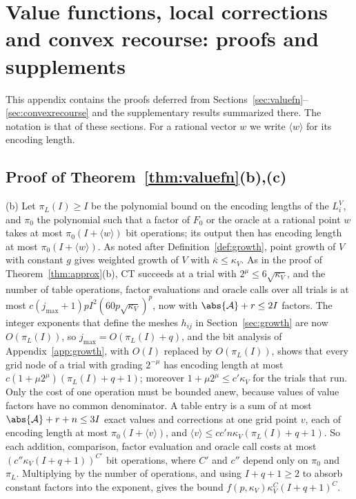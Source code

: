 \section{Value functions, local corrections and convex recourse: proofs and
supplements}\label{app:recourse-convex}

This appendix contains the proofs deferred from
Sections~\ref{sec:valuefn}--\ref{sec:convexrecourse} and the supplementary
results summarized there. The notation is that of these sections. For a
rational vector $w$ we write $\langle w\rangle$ for its encoding length.

\subsection{Proof of Theorem~\ref{thm:valuefn}(b),(c)}

(b) Let $\pi_L(I)\ge I$ be the polynomial bound on the encoding lengths of
the $L_i^V$, and $\pi_0$ the polynomial such that a factor of $F_0$ or the
oracle at a rational point $w$ takes at most $\pi_0(I+\langle w\rangle)$ bit
operations; its output then has encoding length at most
$\pi_0(I+\langle w\rangle)$. As noted after Definition~\ref{def:growth},
point growth of $V$ with constant
$g$ gives weighted growth of $V$ with $\bar\kappa\le\kappa_V$. As in the
proof of Theorem~\ref{thm:approx}(b), CT succeeds at a trial with
$2^\mu\le6\sqrt{\kappa_V}$, and the number of table operations, factor
evaluations and oracle calls over all trials is at most
$c(j_{\max}+1)pI^2(60p\sqrt{\kappa_V})^p$, now with $\abs{\mathcal A}+r\le2I$
factors. The integer exponents that define the meshes $h_{ij}$ in
Section~\ref{sec:growth} are now $O(\pi_L(I))$, so
$j_{\max}=O(\pi_L(I)+q)$, and
the bit analysis of Appendix~\ref{app:growth}, with $O(I)$ replaced by
$O(\pi_L(I))$, shows that
every grid node of a trial with grading $2^{-\mu}$ has encoding length at
most $c(1+\mu2^\mu)(\pi_L(I)+q+1)$; moreover $1+\mu2^\mu\le c'\kappa_V$ for
the trials that run. Only the cost of one operation must be bounded anew,
because values of value factors have no common denominator. A table entry
is a sum of at most $\abs{\mathcal A}+r+n\le3I$ exact values and corrections
at one grid point $v$, each of encoding length at most
$\pi_0(I+\langle v\rangle)$, and $\langle v\rangle\le
cc'n\kappa_V(\pi_L(I)+q+1)$. So each addition, comparison, factor evaluation
and oracle call costs at most $(c''\kappa_V(I+q+1))^{C'}$ bit operations,
where $C'$ and $c''$ depend only on $\pi_0$ and $\pi_L$. Multiplying by the
number of operations, and using $I+q+1\ge2$ to absorb constant factors into
the exponent, gives the bound $f(p,\kappa_V)\kappa_V^C(I+q+1)^C$.

